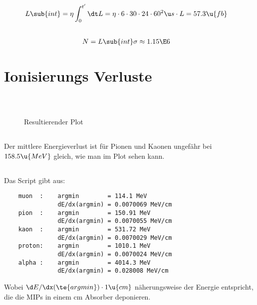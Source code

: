 \documentclass[exb]{exercise_5.0}
\begin{document}
\subsection{}
\begin{align*}
    L\sub{int} &= \eta \int_0^{t'} \dt L 
    = \eta \cdot 6\cdot 30\cdot 24\cdot 60^2\u s \cdot L 
    =  57.3\u{fb } 
\end{align*}

\subsection{}
\begin{align*}
    N &= L\sub{int} \sigma \approx 1.15\E6 
\end{align*}

\section{Ionisierungs Verluste}
\subsection{}
\, 


\begin{figure}[H]
    \centering
    
    \caption{Resultierender Plot}
\end{figure}

\subsection{}
Der mittlere Energieverlust ist für Pionen und Kaonen ungefähr bei $158.5\u{MeV}$ gleich, wie man im Plot sehen kann.

\subsection{}
Das Script gibt aus:
\begin{verbatim}
    muon  :    argmin        = 114.1 MeV
               dE/dx(argmin) = 0.0070069 MeV/cm
    pion  :    argmin        = 150.91 MeV
               dE/dx(argmin) = 0.0070055 MeV/cm
    kaon  :    argmin        = 531.72 MeV
               dE/dx(argmin) = 0.0070029 MeV/cm
    proton:    argmin        = 1010.1 MeV
               dE/dx(argmin) = 0.0070024 MeV/cm
    alpha :    argmin        = 4014.3 MeV
               dE/dx(argmin) = 0.028008 MeV/cm
\end{verbatim}
Wobei $\d E/\dx(\te{argmin})\cdot 1\u{cm}$ näherungsweise der Energie entspricht, die die MIPs in einem cm Absorber deponieren.
\end{document}
